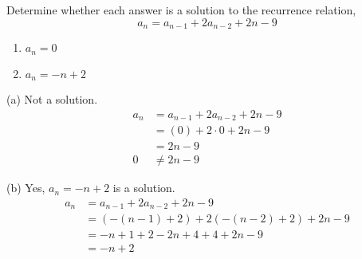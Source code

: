 \begin{questions}
 Determine whether each answer is a solution to the recurrence relation, 
$$ a_n = a_{n-1} + 2a_{n-2} + 2n - 9 $$
    \begin{enumerate}[label=(\alph*),topsep=0pt,itemsep=0pt,parsep=0pt]
        \item $a_n = 0$
        \item $a_n = -n +2$
    \end{enumerate}
    \ifprintanswers
        \vspace{-10pt}
    \fi
\begin{solution}
    \begin{minipage}{0.5\textwidth}
      (a) Not a solution. 
        \begin{align*}
            a_n &= a_{n-1} + 2a_{n-2} + 2n - 9 \\
            &= (0) + 2\cdot0 + 2n - 9 \\
            &= 2n - 9 \\
            0 &\neq 2n - 9
        \end{align*}
    \end{minipage}
    \begin{minipage}{0.5\textwidth}
      (b) Yes, $a_n = -n + 2$ is a solution.
        \begin{align*}
            a_n &= a_{n-1} + 2a_{n-2} + 2n - 9 \\
            &= (-(n-1) + 2) + 2(-(n-2) + 2) + 2n -9 \\
            &= -n + 1 + 2 -2n + 4 + 4 + 2n -9 \\
            &= -n +2 \\
        \end{align*}
    \end{minipage}
\end{solution}




\end{questions}
